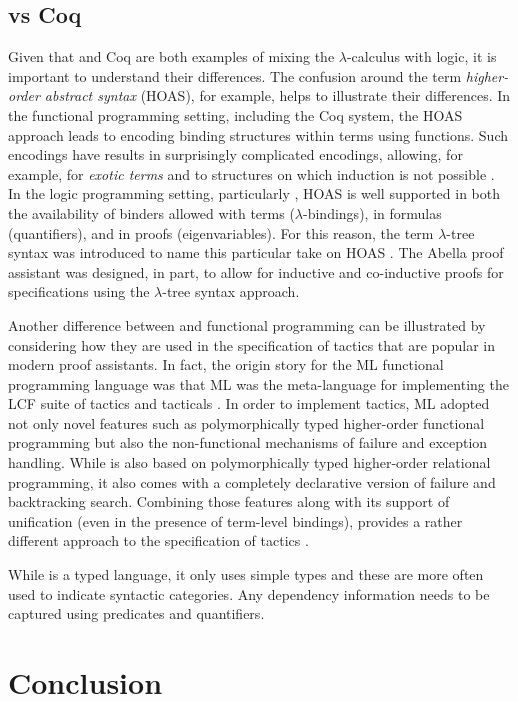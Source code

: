 \documentclass[a4paper,USenglish,cleveref, autoref, thm-restate]{lipics-v2019}
\begin{document}
\subsection{\lP vs Coq}

Given that \lP and Coq are both examples of mixing the
$\lambda$-calculus with logic, it is important to understand their
differences.  The confusion around the term \emph{higher-order
abstract syntax} (HOAS), for example, helps to illustrate their
differences.  In the functional programming setting, including the Coq
system, the HOAS approach leads to encoding binding structures within
terms using functions.  Such encodings have results in surprisingly
complicated encodings, allowing, for example, for \emph{exotic terms}
\cite{despeyroux95tlca} and to structures on which induction is not
possible \cite{roeckl01fossacs}.  In the logic programming setting,
particularly \lP, HOAS is well supported in both the availability of
binders allowed with terms ($\lambda$-bindings), in formulas
(quantifiers), and in proofs (eigenvariables).  For this reason, the
term $\lambda$-tree syntax was introduced to name this particular take
on HOAS \cite{miller19jar}.  The Abella proof assistant
\cite{baelde14jfr} was designed, in part, to allow for inductive and
co-inductive proofs for specifications using the $\lambda$-tree syntax
approach.

Another difference between \lP and functional programming can be
illustrated by considering how they are used in the specification of
tactics that are popular in modern proof assistants.  In fact, the
origin story for the ML functional programming language was that ML
was the meta-language for implementing the LCF suite of tactics and
tacticals \cite{gordon79}.  In order to implement tactics, ML adopted
not only novel features such as polymorphically typed higher-order
functional programming but also the non-functional mechanisms of
failure and exception handling.  While \lP is also based on
polymorphically typed higher-order relational programming, it also
comes with a completely declarative version of failure and
backtracking search.  Combining those features along with its support
of unification (even in the presence of term-level bindings), \lP
provides a rather different approach to the specification of tactics
\cite{felty93jar}.

While \lP is a typed language, it only uses simple types and these are
more often used to indicate syntactic categories.  Any dependency
information needs to be captured using predicates and quantifiers. 








\section{Conclusion}



\end{document}
